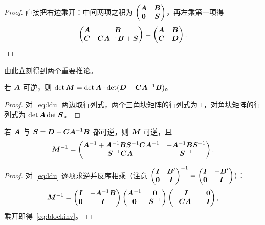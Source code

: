 \begin{proof}
直接把右边乘开：中间两项之积为 $\begin{pmatrix}\bm{A}&\bm{B}\\ \bm{0}&\bm{S}\end{pmatrix}$，再左乘第一项得
\[
\begin{pmatrix}\bm{A}&\bm{B}\\ \bm{C}&\bm{C}\bm{A}^{-1}\bm{B}+\bm{S}\end{pmatrix}=\begin{pmatrix}\bm{A}&\bm{B}\\ \bm{C}&\bm{D}\end{pmatrix}.
\]
\end{proof}

由此立刻得到两个重要推论。

\begin{theorem}[分块行列式]\label{thm:blockdet}
若 $\bm{A}$ 可逆，则 $\det\bm{M}=\det\bm{A}\cdot\det(\bm{D}-\bm{C}\bm{A}^{-1}\bm{B})$。
\end{theorem}

\begin{proof}
对~\eqref{eq:ldu} 两边取行列式，两个三角块矩阵的行列式为 $1$，对角块矩阵的行列式为 $\det\bm{A}\det\bm{S}$。
\end{proof}

\begin{theorem}[分块求逆]\label{thm:blockinv}
若 $\bm{A}$ 与 $\bm{S}=\bm{D}-\bm{C}\bm{A}^{-1}\bm{B}$ 都可逆，则 $\bm{M}$ 可逆，且
\begin{equation}\label{eq:blockinv}
\bm{M}^{-1}=
\begin{pmatrix}
\bm{A}^{-1}+\bm{A}^{-1}\bm{B}\bm{S}^{-1}\bm{C}\bm{A}^{-1} & -\bm{A}^{-1}\bm{B}\bm{S}^{-1}\\
-\bm{S}^{-1}\bm{C}\bm{A}^{-1} & \bm{S}^{-1}
\end{pmatrix}.
\end{equation}
\end{theorem}

\begin{proof}
对~\eqref{eq:ldu} 逐项求逆并反序相乘（注意 $\begin{pmatrix}\bm{I}&\bm{B}'\\ \bm{0}&\bm{I}\end{pmatrix}^{-1}=\begin{pmatrix}\bm{I}&-\bm{B}'\\ \bm{0}&\bm{I}\end{pmatrix}$）：
\[
\bm{M}^{-1}
=\begin{pmatrix}\bm{I}&-\bm{A}^{-1}\bm{B}\\ \bm{0}&\bm{I}\end{pmatrix}
\begin{pmatrix}\bm{A}^{-1}&\bm{0}\\ \bm{0}&\bm{S}^{-1}\end{pmatrix}
\begin{pmatrix}\bm{I}&\bm{0}\\ -\bm{C}\bm{A}^{-1}&\bm{I}\end{pmatrix},
\]
乘开即得~\eqref{eq:blockinv}。
\end{proof}

